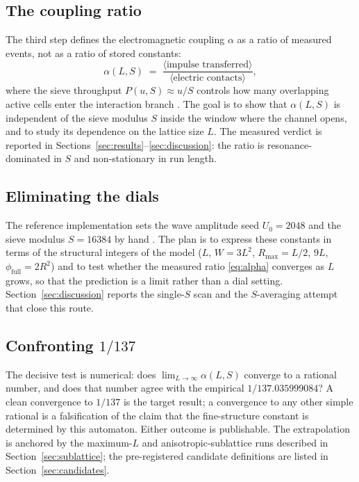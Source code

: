 \documentclass[11pt,a4paper]{article}
\begin{document}
\subsection{The coupling ratio}
\label{sec:coupling}

The third step defines the electromagnetic coupling $\alpha$ as a ratio of
measured events, not as a ratio of stored constants:
\begin{equation}
  \alpha(L,S) \;=\; \frac{\langle \text{impulse transferred} \rangle}
                           {\langle \text{electric contacts} \rangle},
  \label{eq:alpha}
\end{equation}
where the sieve throughput $P(u,S)\approx u/S$ controls how many overlapping
active cells enter the interaction branch \cite{itfrombit}. The goal is to
show that $\alpha(L,S)$ is independent of the sieve modulus $S$ inside the
window where the channel opens, and to study its dependence on the lattice
size $L$. The measured verdict is reported in
Sections~\ref{sec:results}--\ref{sec:discussion}: the ratio is
resonance-dominated in $S$ and non-stationary in run length.

\subsection{Eliminating the dials}
\label{sec:dials}

The reference implementation sets the wave amplitude seed $U_0=2048$ and the
sieve modulus $S=16384$ by hand \cite{itfrombit}. The plan is to express
these constants in terms of the structural integers of the model
($L$, $W=3L^2$, $R_{\max}=L/2$, $9L$, $\phi_{\mathrm{full}}=2R^2$) and to
test whether the measured ratio \eqref{eq:alpha} converges as $L$ grows, so
that the prediction is a limit rather than a dial setting. Section~\ref{sec:discussion}
reports the single-$S$ scan and the $S$-averaging attempt that close this
route.

\subsection{Confronting \texorpdfstring{$1/137$}{1/137}}
\label{sec:137}

The decisive test is numerical: does $\lim_{L\to\infty}\alpha(L,S)$ converge
to a rational number, and does that number agree with the empirical
$1/137.035999084$? A clean convergence to $1/137$ is the target result; a
convergence to any other simple rational is a falsification of the claim
that the fine-structure constant is determined by this automaton. Either
outcome is publishable. The extrapolation is anchored by the maximum-$L$ and
anisotropic-sublattice runs described in Section~\ref{sec:sublattice}; the
pre-registered candidate definitions are listed in
Section~\ref{sec:candidates}.
\end{document}
